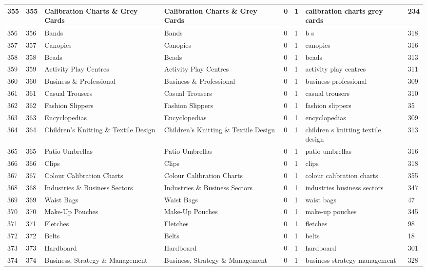 \begin{longtable}{|l|l|l|l|l|l|l|l|}
355 & 355 & Calibration Charts \& Grey Cards & Calibration Charts \& Grey Cards & 0 & 1 & calibration charts grey cards & 234 \\ \hline 
356 & 356 & Bands & Bands & 0 & 1 & b s & 318 \\ \hline 
357 & 357 & Canopies & Canopies & 0 & 1 & canopies & 316 \\ \hline 
358 & 358 & Beads & Beads & 0 & 1 & beads & 313 \\ \hline 
359 & 359 & Activity Play Centres & Activity Play Centres & 0 & 1 & activity play centres & 311 \\ \hline 
360 & 360 & Business \& Professional & Business \& Professional & 0 & 1 & business professional & 309 \\ \hline 
361 & 361 & Casual Trousers & Casual Trousers & 0 & 1 & casual trousers & 310 \\ \hline 
362 & 362 & Fashion Slippers & Fashion Slippers & 0 & 1 & fashion slippers & 35 \\ \hline 
363 & 363 & Encyclopedias & Encyclopedias & 0 & 1 & encyclopedias & 309 \\ \hline 
364 & 364 & Children's Knitting \& Textile Design & Children's Knitting \& Textile Design & 0 & 1 & children s knitting textile design & 313 \\ \hline 
365 & 365 & Patio Umbrellas & Patio Umbrellas & 0 & 1 & patio umbrellas & 316 \\ \hline 
366 & 366 & Clips & Clips & 0 & 1 & clips & 318 \\ \hline 
367 & 367 & Colour Calibration Charts & Colour Calibration Charts & 0 & 1 & colour calibration charts & 355 \\ \hline 
368 & 368 & Industries \& Business Sectors & Industries \& Business Sectors & 0 & 1 & industries business sectors & 347 \\ \hline 
369 & 369 & Waist Bags & Waist Bags & 0 & 1 & waist bags & 47 \\ \hline 
370 & 370 & Make-Up Pouches & Make-Up Pouches & 0 & 1 & make-up pouches & 345 \\ \hline 
371 & 371 & Fletches & Fletches & 0 & 1 & fletches & 98 \\ \hline 
372 & 372 & Belts & Belts & 0 & 1 & belts & 18 \\ \hline 
373 & 373 & Hardboard & Hardboard & 0 & 1 & hardboard & 301 \\ \hline 
374 & 374 & Business, Strategy \& Management & Business, Strategy \& Management & 0 & 1 & business strategy management & 328 \\ \hline 

\end{longtable}
